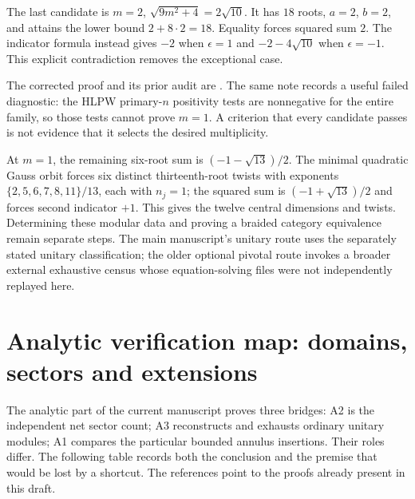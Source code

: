 The last candidate is $m=2$, $\sqrt{9m^2+4}=2\sqrt{10}$.
It has $18$ roots, $a=2$, $b=2$, and attains the lower bound
$2+8\cdot2=18$. Equality forces squared sum $2$. The indicator
formula instead gives $-2$ when $\epsilon=1$ and
$-2-4\sqrt{10}$ when $\epsilon=-1$. This explicit contradiction
removes the exceptional case.

The corrected proof and its prior audit are
.
The same note records a useful failed diagnostic: the HLPW
primary-$n$ positivity tests are nonnegative for the entire family,
so those tests cannot prove $m=1$. A criterion that every candidate
passes is not evidence that it selects the desired multiplicity.

At $m=1$, the remaining six-root sum is
$(-1-\sqrt{13})/2$. The minimal quadratic Gauss orbit forces
six distinct thirteenth-root twists with exponents
$\{2,5,6,7,8,11\}/13$, each with $n_j=1$; the squared sum is
$(-1+\sqrt{13})/2$ and forces second indicator $+1$.
This gives the twelve central dimensions and twists. Determining
these modular data and proving a braided category equivalence
remain separate steps. The main manuscript's unitary route uses
the separately stated unitary classification; the older optional
pivotal route invokes a broader external exhaustive census whose
equation-solving files were not independently replayed here.

\section{Analytic verification map: domains, sectors and extensions}
\label{expstructure:analytic-map}

The analytic part of the current manuscript proves three bridges:
A2 is the independent net sector count; A3 reconstructs and exhausts
ordinary unitary modules; A1 compares the particular bounded annulus
insertions. Their roles differ. The following table records both
the conclusion and the premise that would be lost by a shortcut.
The references point to the proofs already present in this draft.

